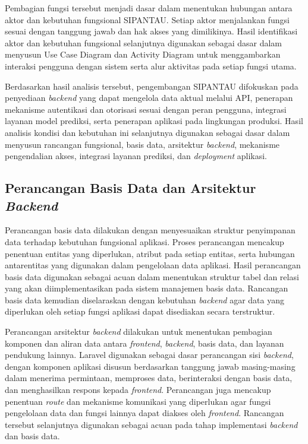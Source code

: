 Pembagian fungsi tersebut menjadi dasar dalam menentukan hubungan antara aktor dan kebutuhan fungsional SIPANTAU. Setiap aktor menjalankan fungsi sesuai dengan tanggung jawab dan hak akses yang dimilikinya. Hasil identifikasi aktor dan kebutuhan fungsional selanjutnya digunakan sebagai dasar dalam menyusun Use Case Diagram dan Activity Diagram untuk menggambarkan interaksi pengguna dengan sistem serta alur aktivitas pada setiap fungsi utama.

Berdasarkan hasil analisis tersebut, pengembangan SIPANTAU difokuskan pada penyediaan \textit{backend} yang dapat mengelola data aktual melalui API, penerapan mekanisme autentikasi dan otorisasi sesuai dengan peran pengguna, integrasi layanan model prediksi, serta penerapan aplikasi pada lingkungan produksi. Hasil analisis kondisi dan kebutuhan ini selanjutnya digunakan sebagai dasar dalam menyusun rancangan fungsional, basis data, arsitektur \textit{backend}, mekanisme pengendalian akses, integrasi layanan prediksi, dan \textit{deployment} aplikasi.

\subsection{Perancangan Basis Data dan Arsitektur \textit{Backend}}

Perancangan basis data dilakukan dengan menyesuaikan struktur penyimpanan data terhadap kebutuhan fungsional aplikasi. Proses perancangan mencakup penentuan entitas yang diperlukan, atribut pada setiap entitas, serta hubungan antarentitas yang digunakan dalam pengelolaan data aplikasi. Hasil perancangan basis data digunakan sebagai acuan dalam menentukan struktur tabel dan relasi yang akan diimplementasikan pada sistem manajemen basis data. Rancangan basis data kemudian diselaraskan dengan kebutuhan \textit{backend} agar data yang diperlukan oleh setiap fungsi aplikasi dapat disediakan secara terstruktur.

Perancangan arsitektur \textit{backend} dilakukan untuk menentukan pembagian komponen dan aliran data antara \textit{frontend}, \textit{backend}, basis data, dan layanan pendukung lainnya. Laravel digunakan sebagai dasar perancangan sisi \textit{backend}, dengan komponen aplikasi disusun berdasarkan tanggung jawab masing-masing dalam menerima permintaan, memproses data, berinteraksi dengan basis data, dan menghasilkan respons kepada \textit{frontend}. Perancangan juga mencakup penentuan \textit{route} dan mekanisme komunikasi yang diperlukan agar fungsi pengelolaan data dan fungsi lainnya dapat diakses oleh \textit{frontend}. Rancangan tersebut selanjutnya digunakan sebagai acuan pada tahap implementasi \textit{backend} dan basis data.

